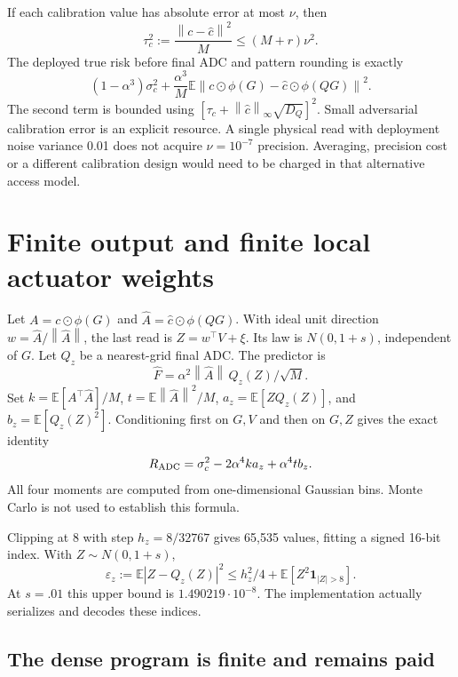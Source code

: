 \documentclass[11pt]{article}
\newcommand{\E}{\mathbb E}
\newcommand{\norm}[1]{\left\lVert#1\right\rVert}
\begin{document}
If each calibration value has absolute error at most $\nu$, then
\begin{equation}
\tau_c^2:=\frac{\norm{c-\widehat c}^2}{M}\le(M+r)\nu^2.
\end{equation}
The deployed true risk before final ADC and pattern rounding is exactly
\begin{equation}
(1-\alpha^3)\sigma_c^2+
\frac{\alpha^3}{M}\E\norm{c\odot\phi(G)-\widehat c\odot\phi(QG)}^2.
\label{eq:learnerr}
\end{equation}
The second term is bounded using $[\tau_c+\norm{\widehat c}_\infty\sqrt{D_Q}]^2$. Small adversarial calibration error is an explicit resource. A single physical read with deployment noise variance 0.01 does not acquire $\nu=10^{-7}$ precision. Averaging, precision cost or a different calibration design would need to be charged in that alternative access model.

\section{Finite output and finite local actuator weights}

Let $A=c\odot\phi(G)$ and $\widehat A=\widehat c\odot\phi(QG)$. With ideal unit direction $w=\widehat A/\norm{\widehat A}$, the last read is $Z=w^\top V+\xi$. Its law is $N(0,1+s)$, independent of $G$. Let $Q_z$ be a nearest-grid final ADC. The predictor is
\[
\widehat F=\alpha^2\norm{\widehat A}\,Q_z(Z)/\sqrt M.
\]
Set $k=\E[A^\top\widehat A]/M$, $t=\E\norm{\widehat A}^2/M$, $a_z=\E[ZQ_z(Z)]$, and $b_z=\E[Q_z(Z)^2]$. Conditioning first on $G,V$ and then on $G,Z$ gives the exact identity
\begin{equation}
R_{\rm ADC}=\sigma_c^2-2\alpha^4ka_z+\alpha^4tb_z.
\label{eq:adc}
\end{equation}
All four moments are computed from one-dimensional Gaussian bins. Monte Carlo is not used to establish this formula.

Clipping at 8 with step $h_z=8/32767$ gives 65,535 values, fitting a signed 16-bit index. With $Z\sim N(0,1+s)$,
\[
\varepsilon_z:=\E|Z-Q_z(Z)|^2
\le h_z^2/4+\E[Z^2\mathbf1_{|Z|>8}].
\]
At $s=.01$ this upper bound is $1.490219\cdot10^{-8}$. The implementation actually serializes and decodes these indices.

\subsection{The dense program is finite and remains paid}
\end{document}
